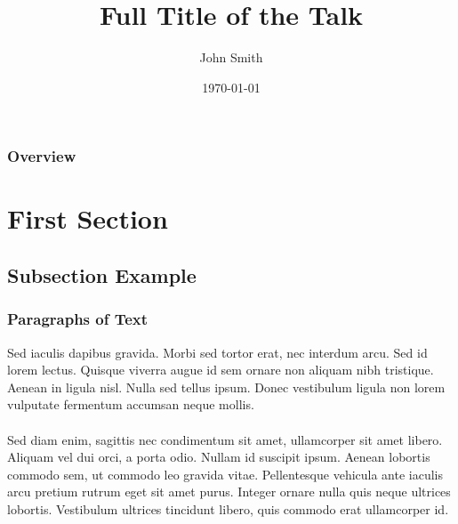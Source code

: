 \documentclass[compress]{beamer}
\title[Short title]{Full Title of the Talk} %
\author{John Smith} %
\institute[UCLA] %
{
University of California \\ %
\medskip
\textit{john@smith.com} %
}
\date{\today} %
\numberwithin{figure}{section}
\numberwithin{table}{section}
\numberwithin{equation}{section}
\numberwithin{thm}{section}
\numberwithin{defn}{section}
\numberwithin{lmm}{section}
\theoremstyle{example}
\numberwithin{figure}{section}
\numberwithin{table}{section}
\numberwithin{equation}{section}
\begin{document}
\begin{frame}
\titlepage %
\end{frame}

\begin{frame}
\frametitle{Overview} %
\tableofcontents[hideallsubsections] %
\end{frame}


\section{First Section} %

\subsection{Subsection Example} %

\begin{frame}
\frametitle{Paragraphs of Text}
Sed iaculis dapibus gravida. Morbi sed tortor erat, nec interdum arcu. Sed id lorem lectus. Quisque viverra augue id sem ornare non aliquam nibh tristique. Aenean in ligula nisl. Nulla sed tellus ipsum. Donec vestibulum ligula non lorem vulputate fermentum accumsan neque mollis.\\~\\

Sed diam enim, sagittis nec condimentum sit amet, ullamcorper sit amet libero. Aliquam vel dui orci, a porta odio. Nullam id suscipit ipsum. Aenean lobortis commodo sem, ut commodo leo gravida vitae. Pellentesque vehicula ante iaculis arcu pretium rutrum eget sit amet purus. Integer ornare nulla quis neque ultrices lobortis. Vestibulum ultrices tincidunt libero, quis commodo erat ullamcorper id.
\end{frame}
\end{document}
